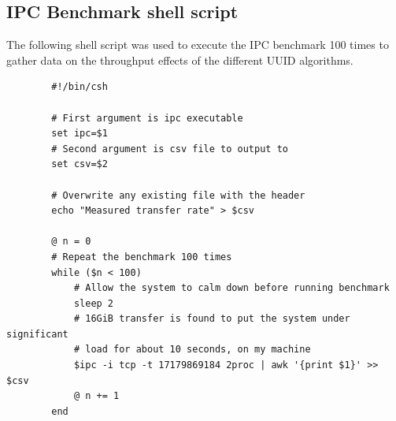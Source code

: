 \documentclass[a4paper,12pt,twoside,openright]{report}
\begin{document}
	
	
	
	\begin{appendices}
		\chapter{IPC Benchmark shell script}
		\label{appendix:IPC}
		
		The following shell script was used to execute the IPC benchmark 100 times to gather data on the throughput effects of the different UUID algorithms.
		
		\begin{verbatim}
		#!/bin/csh
		
		# First argument is ipc executable
		set ipc=$1
		# Second argument is csv file to output to
		set csv=$2
		
		# Overwrite any existing file with the header
		echo "Measured transfer rate" > $csv
		
		@ n = 0
		# Repeat the benchmark 100 times
		while ($n < 100)
		    # Allow the system to calm down before running benchmark
		    sleep 2
		    # 16GiB transfer is found to put the system under significant
		    # load for about 10 seconds, on my machine
		    $ipc -i tcp -t 17179869184 2proc | awk '{print $1}' >> $csv
		    @ n += 1
		end
		\end{verbatim}
	\end{appendices}
	
	
	
	
	
	
\end{document}

